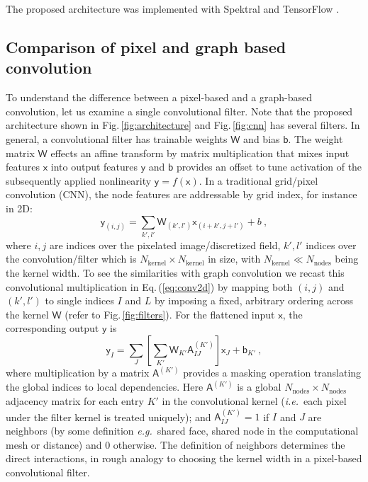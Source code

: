 \documentclass[12pt,reqno]{article}
\newcommand{\fref}[1]{Fig.\,\ref{#1}}
\newcommand{\eref}[1]{Eq.\,(\ref{#1})}
\newcommand{\ie}{{\it i.e.}\!\, }
\newcommand{\eg}{{\it e.g.}\!\, }
\newcommand{\As}{\mathsf{A}}
\newcommand{\xs}{\mathsf{x}}
\newcommand{\ys}{\mathsf{y}}
\newcommand{\Ws}{\mathsf{W}}
\newcommand{\bs}{\mathsf{b}}
\begin{document}
The proposed architecture was implemented with Spektral \cite{spektral} and TensorFlow \cite{tensorflow}.

\subsection{Comparison of pixel and graph based convolution}
To understand the difference between a pixel-based and a graph-based convolution, let us examine a single convolutional filter.
Note that the proposed architecture shown in \fref{fig:architecture} and \fref{fig:cnn} has several filters.
In general, a convolutional filter has trainable weights $\Ws$ and bias $\bs$.
The weight matrix $\Ws$ effects an affine transform by matrix multiplication that mixes input features $\xs$ into output features $\ys$ and $\bs$ provides an offset to tune activation of the subsequently applied nonlinearity $\ys=f(\xs)$.
In a traditional grid/pixel convolution (CNN), the node features are addressable by grid index, for instance in 2D:
\begin{equation} \label{eq:conv2d}
\ys_{(i,j)} = \sum_{k',l'} \Ws_{(k',l')} \xs_{(i+k',j+l')} + b \ ,
\end{equation}
where $i,j$ are indices over the pixelated image/discretized field, $k',l'$ indices over the convolution/filter which is $N_\text{kernel} \times N_\text{kernel}$ in size, with $N_\text{kernel} \ll N_\text{nodes}$ being the kernel width.
To see the similarities with graph convolution we recast this convolutional multiplication in \eref{eq:conv2d} by mapping both $(i,j)$ and  $(k',l')$ to single indices $I$ and $L$ by imposing a fixed, arbitrary ordering across the kernel $\Ws$ (refer to \fref{fig:filters}).
For the flattened input $\xs$, the corresponding output $\ys$ is
\begin{equation} \label{eq:gconv}
\ys_I = \sum_J \left[ \sum_{K'} \Ws_{K'}  \As_{IJ}^{(K')} \right] \xs_J + \bs_{K'} \ ,
\end{equation}
where multiplication by a matrix $\As^{(K')}$ provides a masking operation translating the global indices to local dependencies.
Here $\As^{(K')}$ is a global $N_\text{nodes} \times N_\text{nodes}$ adjacency matrix for each entry $K'$ in the convolutional kernel (\ie each pixel under the filter kernel is treated uniquely);
and $\As_{IJ}^{(K')} = 1$ if $I$ and $J$ are neighbors (by some definition \eg shared face, shared node in the computational mesh or distance) and 0 otherwise.
The definition of neighbors determines the direct interactions, in rough analogy to choosing the kernel width in a pixel-based convolutional filter.
\end{document}
